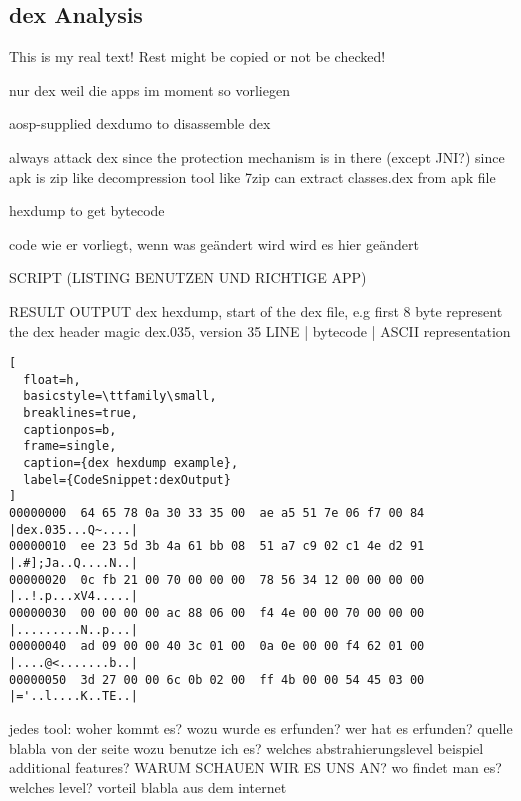 \subsection{dex Analysis} \label{subsubsection:tools-dex}
This is my real text! Rest might be copied or not be checked!


%
nur dex weil die apps im moment so vorliegen

aosp-supplied dexdumo to disassemble dex

\cite{andevconDalvikART}
%
%
always attack dex since the protection mechanism is in there (except JNI?)
since apk is zip like decompression tool like 7zip can extract classes.dex from apk file

hexdump to get bytecode


code wie er vorliegt, wenn was geändert wird wird es hier geändert



SCRIPT (LISTING BENUTZEN UND RICHTIGE APP)

RESULT OUTPUT
dex hexdump, start of the dex file, e.g first 8 byte represent the dex header magic dex.035, version 35\cite{developersDalvik}
LINE | bytecode | ASCII representation
\begin{lstlisting}[
  float=h,
  basicstyle=\ttfamily\small,
  breaklines=true,
  captionpos=b,
  frame=single,
  caption={dex hexdump example},
  label={CodeSnippet:dexOutput}
]
00000000  64 65 78 0a 30 33 35 00  ae a5 51 7e 06 f7 00 84  |dex.035...Q~....|
00000010  ee 23 5d 3b 4a 61 bb 08  51 a7 c9 02 c1 4e d2 91  |.#];Ja..Q....N..|
00000020  0c fb 21 00 70 00 00 00  78 56 34 12 00 00 00 00  |..!.p...xV4.....|
00000030  00 00 00 00 ac 88 06 00  f4 4e 00 00 70 00 00 00  |.........N..p...|
00000040  ad 09 00 00 40 3c 01 00  0a 0e 00 00 f4 62 01 00  |....@<.......b..|
00000050  3d 27 00 00 6c 0b 02 00  ff 4b 00 00 54 45 03 00  |='..l....K..TE..|
\end{lstlisting}





jedes tool:\newline
woher kommt es?\newline
wozu wurde es erfunden?\newline
wer hat es erfunden? quelle\newline
blabla von der seite\newline
wozu benutze ich es?\newline
welches abstrahierungslevel\newline
beispiel\newline
additional features?\newline
WARUM SCHAUEN WIR ES UNS AN?\newline
wo findet man es?\newline
welches level?\newline
vorteil\newline
blabla aus dem internet\newline
